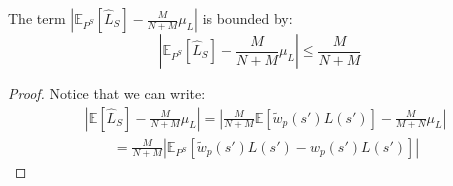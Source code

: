       \begin{lemma}
        The term $\left | \mathbb{E}_{P^S} [\hat{L}_{S}] - \frac{M}{N+M}\mu_{L} \right |$ is bounded by:
        \begin{equation}
          \left | \mathbb{E}_{P^S} [\hat{L}_{S}] - \frac{M}{N+M}\mu_{L} \right | \leq \frac{M}{N+M}
        \end{equation}
        \label{lemma7}
      \end{lemma}
      \begin{proof}
        Notice that we can write:
        \begin{equation}
          \begin{aligned}
            & \left | \mathbb{E}[\hat{L}_{S}] - \frac{M}{N+M}\mu_{L} \right | = \left | \frac{M}{N+M} \mathbb{E}[\tilde{w}_{p}(s')L(s')] - \frac{M}{M+N}\mu_{L} \right | \\
            & \qquad = \frac{M}{N+M} | \mathbb{E}_{P^S}[\tilde{w}_{p}(s')L(s') - w_{p}(s')L(s')]|
          \end{aligned}
          \label{bound1}
        \end{equation}


\end{proof}
